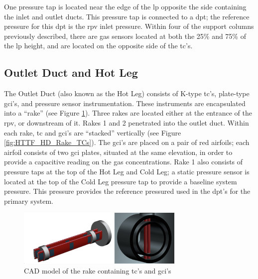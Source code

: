 \documentclass[double,12pt]{beavtex}
\begin{document}
One pressure tap is located near the edge of the \acrshort{lp} opposite the side containing the inlet and outlet ducts. This pressure tap is connected to a \acrshort{dpt}; the reference pressure for this \acrshort{dpt} is the \acrshort{rpv} inlet pressure. Within four of the support columns previously described, there are gas sensors located at both the 25\% and 75\% of the \acrshort{lp} height, and are located on the opposite side of the \acrshort{tc}'s.  

\subsection{Outlet Duct and Hot Leg}

The Outlet Duct (also known as the Hot Leg) consists of K-type \acrshort{tc}'s, plate-type \acrshort{gci}'s, and pressure sensor instrumentation. These instruments are encapsulated into a “rake” (see Figure \ref{fig:Rake_Figure}). Three rakes are located either at the entrance of the \acrshort{rpv}, or downstream of it. Rakes 1 and 2 penetrated into the outlet duct. Within each rake, \acrshort{tc} and \acrshort{gci}’s are “stacked” vertically (see Figure \ref{fig:HTTF_HD_Rake_TCs}). The \acrshort{gci}’s are placed on a pair of red airfoils; each airfoil consists of two \acrshort{gci} plates, situated at the same elevation, in order to provide a capacitive reading on the gas concentrations.  Rake 1 also consists of pressure taps at the top of the Hot Leg and Cold Leg; a static pressure sensor is located at the top of the Cold Leg pressure tap to provide a baseline system pressure. This pressure provides the reference pressured used in the \acrshort{dpt}'s for the primary system.

\begin{figure}
    \begin{center}
    	\includegraphics[width=8cm]{Figures/Rake_Figure.png}
    	\caption{CAD model of the rake containing \acrshort{tc}'s and \acrshort{gci}'s}
    	\label{fig:Rake_Figure}
    	\end{center}
\end{figure}
\end{document}
